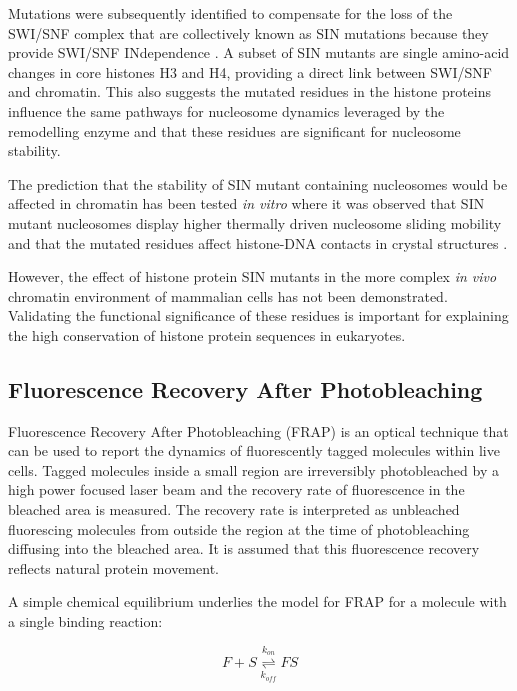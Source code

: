     Mutations were subsequently identified to compensate for the
    loss of the SWI/SNF complex that are collectively known as SIN
    mutations because they provide SWI/SNF INdependence
    \citep{kruger1995amino}.  A subset of SIN mutants are single
    amino-acid changes in core histones H3 and H4, providing a direct
    link between SWI/SNF and chromatin.  This also suggests the
    mutated residues in the histone proteins influence the same
    pathways for nucleosome dynamics leveraged
    by the remodelling enzyme and that
    these residues are significant for nucleosome stability.

    The prediction that the stability of SIN mutant containing
    nucleosomes would be affected in chromatin has been tested \textit{in vitro}
    where it was observed that SIN mutant nucleosomes display higher
    thermally driven nucleosome sliding mobility \citep{flaus2004sin}
    and that the mutated residues affect histone-DNA contacts in
    crystal structures \citep{muthurajan2004crystal}.

    However, the effect of histone protein SIN mutants
    in the more complex \textit{in vivo} chromatin environment
    of mammalian cells has not been demonstrated.
    Validating the functional significance of these residues
    is important for explaining the high conservation of
    histone protein sequences in eukaryotes.

  \subsection{Fluorescence Recovery After Photobleaching}

    Fluorescence Recovery After Photobleaching (FRAP) is an optical technique
    that can be used to report the dynamics of fluorescently
    tagged molecules within live cells.
    Tagged molecules inside a small region are irreversibly photobleached by
    a high power focused laser beam and the recovery rate of fluorescence
    in the bleached area is measured. The recovery rate is interpreted
    as unbleached fluorescing molecules from outside the region
    at the time of photobleaching diffusing into the bleached area.
    It is assumed that this fluorescence recovery
    reflects natural protein movement.

    A simple chemical equilibrium underlies the model for FRAP for a
    molecule with a single binding reaction:

    \begin{displaymath}
      F + S \overset{k_{on}}{\underset{k_{off}}{\rightleftharpoons}} FS
    \end{displaymath}

